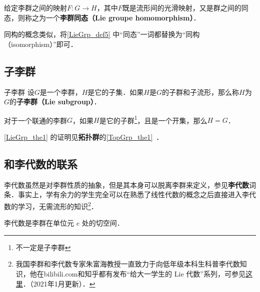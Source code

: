 \begin{definition}{}\label{LieGrp_def5}
给定李群之间的映射$F:G\to H$，其中$F$既是流形间的光滑映射，又是群之间的同态，则称之为一个\textbf{李群同态（Lie groupe homomorphism）}．
\end{definition}

同构的概念类似，将\autoref{LieGrp_def5} 中“同态”一词都替换为“同构（isomorphism）”即可．

\subsection{子李群}

\begin{definition}{子李群}
设$G$是一个李群，$H$是它的子集．如果$H$是$G$的子群和子流形，那么称$H$为$G$的\textbf{子李群（Lie subgroup）}．
\end{definition}

\begin{theorem}{}\label{LieGrp_the1}
对于一个联通的李群$G$，如果$H$是它的子群\footnote{不一定是子李群}，且是一个开集，那么$H=G$．
\end{theorem}

\autoref{LieGrp_the1} 的证明见\textbf{拓扑群}的\autoref{TopGrp_the1}~．

\subsection{和李代数的联系}

李代数虽然是对李群性质的抽象，但是其本身可以脱离李群来定义，参见\textbf{李代数}词条．事实上，学有余力的学生完全可以在熟悉了线性代数的概念之后直接进入李代数的学习，无需流形的知识\footnote{我国李群和李代数专家朱富海教授一直致力于向低年级本科生科普李代数知识，他在bilibili.com和知乎都有发布“给大一学生的 Lie 代数”系列，可参见\href{https://space.bilibili.com/509086270?from=search&seid=2394735306274350134和https://zhuanlan.zhihu.com/p/161735986}{这里}．（2021年1月更新）．}．

李代数是李群在单位元 $e$ 处的切空间．




